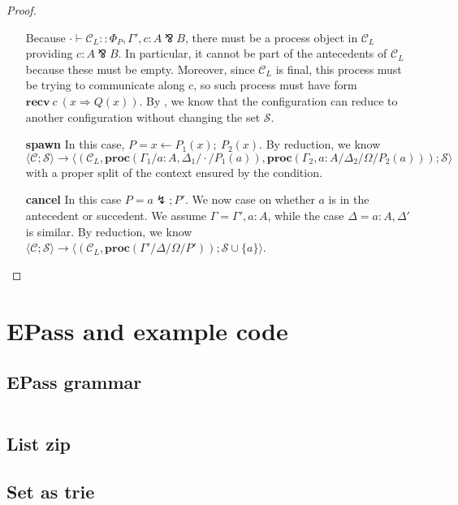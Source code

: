 \documentclass[12pt, openany]{memoir}
\newcommand*{\pare}[0]{\mathbin{\bindnasrepma}}
\newcommand*{\recv}[2]{\textbf{recv}\ #1\ #2}
\newcommand*{\cancel}[1]{#1 \lightning}
\newcommand*{\spawn}[3]{#3 \leftarrow #1(#3);\ #2(#3)}
\newcommand*{\procObj}[4]{\textbf{proc}(#1/#2/#3/#4)}
\newcommand*{\config}[0]{\mathcal{C}}
\newcommand*{\cancelSet}[0]{\mathcal{S}}
\begin{document}
\begin{proof}
\begin{itemize}
    Because $\cdot \vdash \config_L :: \Phi_P, \Gamma', c : A \pare B$, there must be a process object in $\config_L$ providing
    $c : A \pare B$. In particular, it cannot be part of the antecedents of $\config_L$ because
    these must be empty. Moreover, since $\config_L$ is final, this process must
    be trying to communicate along $c$, so such process must have form $\recv{c}{(x \Rightarrow Q(x))}$.
    By , we know that the configuration can reduce to another configuration without changing the set $\cancelSet$.
    \item [\textbf{spawn}] In this case, $P = \spawn{P_1}{P_2}{x}$. By reduction, we know 
    $\langle \config; \cancelSet \rangle \longrightarrow
    \langle (\config_L, \procObj{\Gamma_1}{a : A, \Delta_1}{\cdot}{P_1(a)}, \procObj{\Gamma_2, a : A}{\Delta_2}{\Omega}{P_2(a)}); \cancelSet \rangle$
    with a proper split of the context ensured by the condition.
    \item [\textbf{cancel}] In this case $P = \cancel{a}; P'$.
    We now case on whether $a$ is in the antecedent or succedent. 
    We assume $\Gamma = \Gamma', a : A$, while the case $\Delta = a : A, \Delta'$ is similar.
    By reduction, we know $\langle \config; \cancelSet \rangle \longrightarrow \langle (\config_L, \procObj{\Gamma'}{\Delta}{\Omega}{P'}); \cancelSet \cup \{a\} \rangle$.
  \end{itemize}
\end{proof}
\chapter{EPass and example code} 
\section{EPass grammar} \label{sec:grammar}
\inputminted{text}{code/grammar.txt}
\newpage
\section{List zip} \label{sec:exnzip}

\newpage
\section{Set as trie} \label{sec:trie}

\backmatter
\printbibliography
\end{document}
